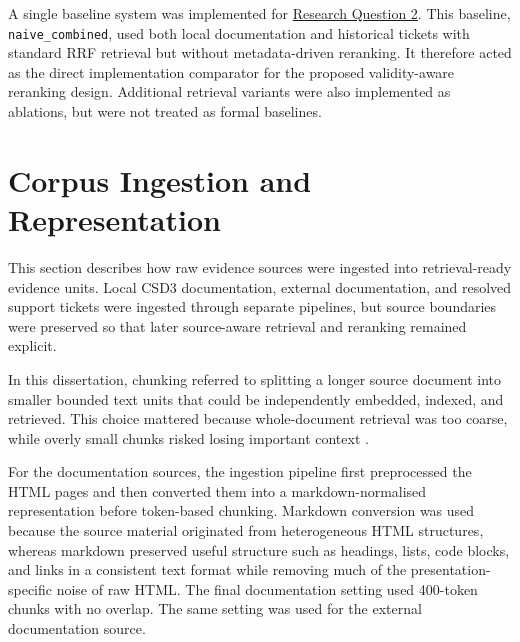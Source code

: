 A single baseline system was implemented for \hyperref[rq:2-validity]{Research Question 2}. This baseline, \texttt{naive\_combined}, used both local documentation and historical tickets with standard \ac{RRF} retrieval but without metadata-driven reranking. It therefore acted as the direct implementation comparator for the proposed validity-aware reranking design. Additional retrieval variants were also implemented as ablations, but were not treated as formal baselines.  

\section{Corpus Ingestion and Representation}
\label{sec:corpus-ingestion-representation}

This section describes how raw evidence sources were ingested into retrieval-ready evidence units. Local \ac{CSD3} documentation, external documentation, and resolved support tickets were ingested through separate pipelines, but source boundaries were preserved so that later source-aware retrieval and reranking remained explicit.

In this dissertation, chunking referred to splitting a longer source document into smaller bounded text units that could be independently embedded, indexed, and retrieved. This choice mattered because whole-document retrieval was too coarse, while overly small chunks risked losing important context \citep{wangDocumentSegmentationMatters2025}. 

For the documentation sources, the ingestion pipeline first preprocessed the HTML pages and then converted them into a markdown-normalised representation before token-based chunking. Markdown conversion was used because the source material originated from heterogeneous HTML structures, whereas markdown preserved useful structure such as headings, lists, code blocks, and links in a consistent text format while removing much of the presentation-specific noise of raw HTML. The final documentation setting used 400-token chunks with no overlap. The same setting was used for the external documentation source. 

